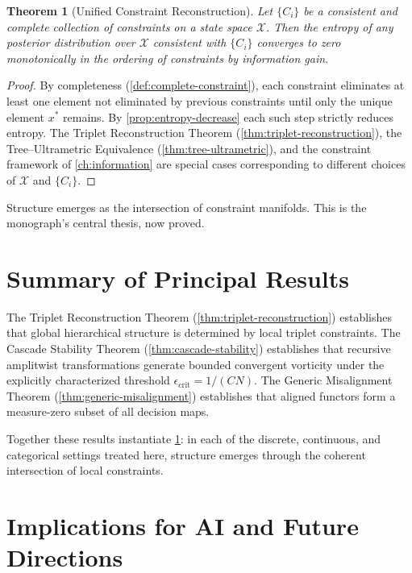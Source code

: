 \documentclass[12pt,a4paper,oneside]{book}
\numberwithin{equation}{chapter}
\theoremstyle{plain}
\newtheorem{theorem}{Theorem}[chapter]
\theoremstyle{definition}
\theoremstyle{remark}
\begin{document}
\begin{theorem}[Unified Constraint Reconstruction]
\label{thm:unified}
Let $\{C_i\}$ be a consistent and complete collection of constraints
on a state space $\mathcal{X}$. Then the entropy of any posterior
distribution over $\mathcal{X}$ consistent with $\{C_i\}$ converges
to zero monotonically in the ordering of constraints by information
gain.
\end{theorem}

\begin{proof}
By completeness (\cref{def:complete-constraint}), each constraint
eliminates at least one element not eliminated by previous constraints
until only the unique element $x^\ast$ remains. By
\cref{prop:entropy-decrease} each such step strictly reduces entropy.
The Triplet Reconstruction Theorem (\cref{thm:triplet-reconstruction}),
the Tree--Ultrametric Equivalence (\cref{thm:tree-ultrametric}), and
the constraint framework of \cref{ch:information} are special cases
corresponding to different choices of $\mathcal{X}$ and $\{C_i\}$.
\end{proof}

Structure emerges as the intersection of constraint manifolds. This is
the monograph's central thesis, now proved.

\section{Summary of Principal Results}

The Triplet Reconstruction Theorem (\cref{thm:triplet-reconstruction})
establishes that global hierarchical structure is determined by local
triplet constraints. The Cascade Stability Theorem
(\cref{thm:cascade-stability}) establishes that recursive amplitwist
transformations generate bounded convergent vorticity under the
explicitly characterized threshold $\epsilon_\mathrm{crit} = 1/(CN)$.
The Generic Misalignment Theorem (\cref{thm:generic-misalignment})
establishes that aligned functors form a measure-zero subset of all
decision maps.

Together these results instantiate \cref{thm:unified}: in each of the
discrete, continuous, and categorical settings treated here, structure
emerges through the coherent intersection of local constraints.

\section{Implications for AI and Future Directions}
\end{document}
